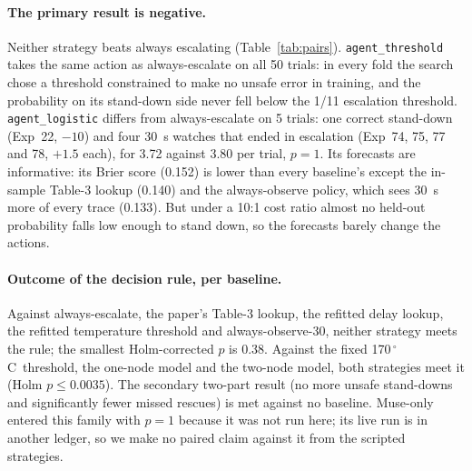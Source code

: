 \documentclass[11pt]{article}
\newcommand{\degC}{\,$^\circ$C}
\begin{document}
\paragraph{The primary result is negative.} Neither strategy beats always escalating (Table~\ref{tab:pairs}).
\texttt{agent\_threshold} takes the same action as always-escalate on all 50 trials: in every fold the search chose a
threshold constrained to make no unsafe error in training, and the probability on its stand-down side never fell
below the 1/11 escalation threshold. \texttt{agent\_logistic} differs from always-escalate on 5 trials: one correct
stand-down (Exp~22, $-10$) and four 30~s watches that ended in escalation (Exp~74, 75, 77 and 78, $+1.5$ each), for
3.72 against 3.80 per trial, $p = 1$. Its forecasts are informative: its Brier score (0.152) is lower than every
baseline's except the in-sample Table-3 lookup (0.140) and the always-observe policy, which sees 30~s more of every
trace (0.133). But under a 10:1 cost ratio almost no held-out probability falls low enough to stand down, so the
forecasts barely change the actions.

\paragraph{Outcome of the decision rule, per baseline.} Against always-escalate, the paper's Table-3 lookup, the
refitted delay lookup, the refitted temperature threshold and always-observe-30, neither strategy meets the rule; the
smallest Holm-corrected $p$ is 0.38. Against the fixed 170\degC\ threshold, the one-node model and the two-node
model, both strategies meet it (Holm $p \le 0.0035$). The secondary two-part result (no more unsafe stand-downs and
significantly fewer missed rescues) is met against no baseline. Muse-only entered this family with $p = 1$ because it was not run here; its live run
is in another ledger, so we make no paired claim against it from the scripted strategies.
\end{document}
